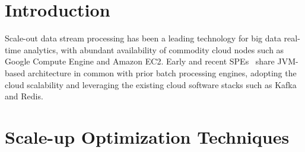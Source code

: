 \documentclass[runningheads]{llncs}
\begin{document}
\section{Introduction}
Scale-out data stream processing has been a leading technology for big data
real-time analytics, with abundant availability of commodity cloud nodes such
as Google Compute Engine and Amazon EC2. Early and recent
\acp{SPE}~\cite{SparkStreaming2012,Storm2014,Flink2015,KafkaStreams2021} share
\ac{JVM}-based architecture in common with prior batch processing engines,
adopting the cloud scalability and leveraging the existing cloud software
stacks such as Kafka and Redis.


\section{Scale-up Optimization Techniques}
\end{document}
